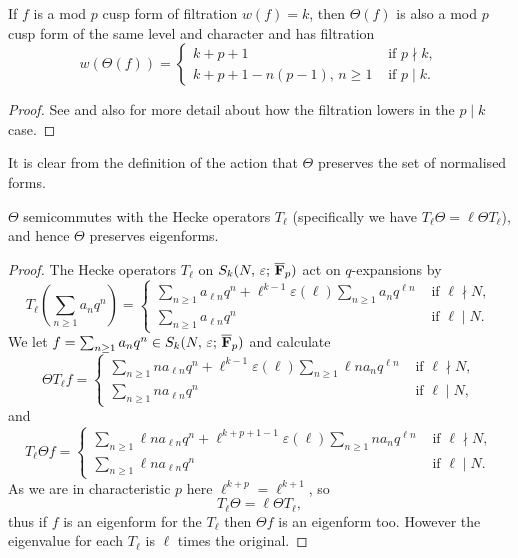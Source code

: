 \documentclass[a4paper,12pt]{article}
\begin{document}
\begin{prop}
If $f$ is a mod $p$ cusp form of filtration $w(f) = k$, then $\Theta(f)$ is also a mod $p$ cusp form of the same level and character and has filtration
\[
w(\Theta(f)) = \begin{cases}
k + p + 1 &\text{ if } p\nmid k,\\
k + p + 1 - n(p-1),\, n\ge 1&\text{ if } p\mid k.
\end{cases}
\]
\end{prop}
\begin{proof}
See \cite{Serre73} and also \cite{Jochnowitz} for more detail about how the filtration lowers in the $p\mid k$ case.
\end{proof}

It is clear from the definition of the action that $\Theta$ preserves the set of normalised forms.

\begin{prop}\label{prop:thetaeigen}
$\Theta$ semicommutes with the Hecke operators $T_{\ell}$ (specifically we have $T_{\ell}\Theta = \ell\Theta T_{\ell}$), and hence $\Theta$ preserves eigenforms.
\end{prop}
\begin{proof}
The Hecke operators $T_{\ell}$ on $S_k(N,\,\varepsilon;\,\overline{\mathbf{F}}_p)$ act on $q$-expansions by
\[
T_{\ell}\left(\sum_{n\ge 1} a_nq^n\right) = \begin{cases}
\sum_{n\ge 1} a_{\ell n}q^n + \ell^{k-1}\varepsilon(\ell)\sum_{n\ge 1} a_{n}q^{\ell n} &\text{ if }\ell \nmid N,\\
\sum_{n\ge 1} a_{\ell n}q^n &\text{ if }\ell \mid N.
\end{cases}
\]
We let $f = \sum_{n\ge 1} a_nq^n\in S_k(N,\,\varepsilon;\,\overline{\mathbf{F}}_p)$ and calculate
\[
\Theta T_{\ell} f = \begin{cases}
\sum_{n\ge 1} na_{\ell n}q^n + \ell^{k-1}\varepsilon(\ell)\sum_{n\ge 1} \ell n a_{n}q^{\ell n} &\text{ if }\ell \nmid N,\\
\sum_{n\ge 1} na_{\ell n}q^n &\text{ if }\ell \mid N,
\end{cases}
\]
and
\[
T_{\ell}\Theta f = \begin{cases}
\sum_{n\ge 1} \ell n a_{\ell n}q^n + \ell^{k+p+1-1} \varepsilon(\ell)\sum_{n\ge 1} n a_{n}q^{\ell n} &\text{ if }\ell \nmid N,\\
\sum_{n\ge 1} \ell n a_{\ell n}q^n &\text{ if }\ell \mid N.
\end{cases}
\]
As we are in characteristic $p$ here $\ell^{k+p} = \ell^{k+1}$, so
\[
 T_{\ell} \Theta = \ell \Theta T_{\ell},
\]
thus if $f$ is an eigenform for the $T_\ell$ then $\Theta f$ is an eigenform too.
However the eigenvalue for each $T_\ell$ is $\ell$ times the original.
\end{proof}
\end{document}

